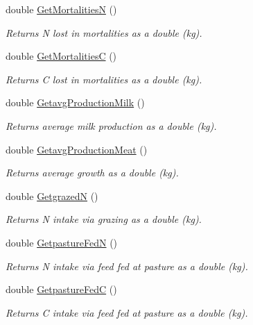\begin{DoxyCompactItemize}
double \mbox{\hyperlink{classlivestock_a3ee0a1109aafb75b7d056a93b04685fb}{Get\+MortalitiesN}} ()
\begin{DoxyCompactList}\small\item\em Returns N lost in mortalities as a double (kg). \end{DoxyCompactList}\item 
double \mbox{\hyperlink{classlivestock_aaf097ac16bc2a1ed7751dcc59d4f62fe}{Get\+MortalitiesC}} ()
\begin{DoxyCompactList}\small\item\em Returns C lost in mortalities as a double (kg). \end{DoxyCompactList}\item 
double \mbox{\hyperlink{classlivestock_a1651811606edb2bb4e9687b404aa573b}{Getavg\+Production\+Milk}} ()
\begin{DoxyCompactList}\small\item\em Returns average milk production as a double (kg). \end{DoxyCompactList}\item 
double \mbox{\hyperlink{classlivestock_a263313014b02fea1070cdaac0b797b06}{Getavg\+Production\+Meat}} ()
\begin{DoxyCompactList}\small\item\em Returns average growth as a double (kg). \end{DoxyCompactList}\item 
double \mbox{\hyperlink{classlivestock_a528e48c445b8b6473e8ac4d72d9a498e}{GetgrazedN}} ()
\begin{DoxyCompactList}\small\item\em Returns N intake via grazing as a double (kg). \end{DoxyCompactList}\item 
double \mbox{\hyperlink{classlivestock_a2fb8301f7beb23e3240f42e773376044}{Getpasture\+FedN}} ()
\begin{DoxyCompactList}\small\item\em Returns N intake via feed fed at pasture as a double (kg). \end{DoxyCompactList}\item 
double \mbox{\hyperlink{classlivestock_a88259956eaef4d65f5ae738d12101c51}{Getpasture\+FedC}} ()
\begin{DoxyCompactList}\small\item\em Returns C intake via feed fed at pasture as a double (kg). \end{DoxyCompactList}\item 

\end{DoxyCompactItemize}

